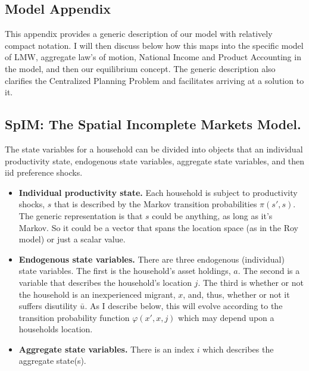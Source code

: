 \documentclass[12pt,pdftex]{article}
\begin{document}
\begin{onehalfspacing}
\newpage

\section{Model Appendix}

This appendix provides a generic description of our model with relatively compact notation. I will then discuss below how this maps into the specific model of LMW, aggregate law's of motion, National Income and Product Accounting in the model, and then our equilibrium concept. The generic description also clarifies the Centralized Planning Problem and facilitates arriving at a solution to it.

\subsection{SpIM: The Spatial Incomplete Markets Model.}

The state variables for a household can be divided into objects that an individual productivity state, endogenous state variables, aggregate state variables, and then iid preference shocks.
\begin{itemize}
\item \textbf{Individual productivity state.} Each household is subject to productivity shocks, $s$ that is described by the Markov transition probabilities $\pi(s',s)$. The generic representation is that $s$ could be anything, as long as it's Markov. So it could be a vector that spans the location space (as in the Roy model) or just a scalar value.

\item \textbf{Endogenous state variables.} There are three endogenous (individual) state variables. The first is the household's asset holdings, $a$. The second is a variable that describes the household's location $j$. The third is whether or not the household is an inexperienced migrant, $x$, and, thus, whether or not it suffers disutility $\bar u$. As I describe below, this will evolve according to the transition probability function $\varphi(x',x, j)$ which may depend upon a households location.

\item \textbf{Aggregate state variables.} There is an index $i$ which describes the aggregate state(s).


\end{itemize}
\end{onehalfspacing}
\end{document}
